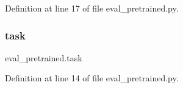 Definition at line 17 of file eval\+\_\+pretrained.\+py.

\mbox{\label{namespaceeval__pretrained_a6f09c22ad62cb924ea3f077d66ff37e7}} 
\subsubsection{\texorpdfstring{task}{task}}
{\footnotesize\ttfamily eval\+\_\+pretrained.\+task}



Definition at line 14 of file eval\+\_\+pretrained.\+py.

